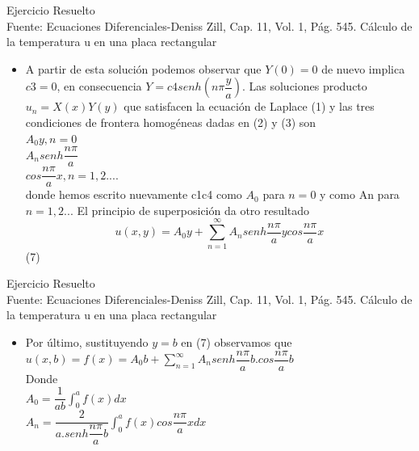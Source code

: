 \documentclass[10pt,a4paper]{beamer}
\begin{document}
\begin{frame}{Ejercicio Resuelto\\
}{Fuente: Ecuaciones Diferenciales-Deniss Zill, Cap. 11, Vol. 1, Pág. 545.
Cálculo de la temperatura u en una placa rectangular}


  \begin{itemize}
  \item
   A partir de esta solución podemos observar que $Y(0)=0$ de nuevo implica $c3=0$, en
consecuencia $Y=c4senh(n\pi\dfrac{y}{a})$.
Las soluciones producto $u_{n}=X(x)Y(y)$ que satisfacen la ecuación de Laplace (1) y las
tres condiciones de frontera homogéneas dadas en (2) y (3) son\\
$A_{0}y, n=0$\\
$A_{n}senh\dfrac{n\pi}{a}$\\
$cos\dfrac{n\pi}{a}x, n=1,2....$\\
donde hemos escrito nuevamente c1c4 como $A_{0}$ para $n=0$ y como An para $n=1,2...$
El principio de superposición da otro resultado\\
$$u(x,y)=A_{0}y+\sum^{\infty}_{n=1}A_{n}senh\dfrac{n\pi}{a}ycos\dfrac{n\pi}{a}x$$ (7)\\


    
  \end{itemize}
\end{frame}

\begin{frame}{Ejercicio Resuelto\\
}{Fuente: Ecuaciones Diferenciales-Deniss Zill, Cap. 11, Vol. 1, Pág. 545.
Cálculo de la temperatura u en una placa rectangular}


  \begin{itemize}
  \item
   Por último, sustituyendo $y=b$ en (7) observamos que
$u(x,b)=f(x)=A_{0}b+\sum^{\infty}_{n=1}A_{n}senh\dfrac{n\pi}{a}b.cos\dfrac{n\pi}{a}b$\\
Donde\\
$A_{0}=\dfrac{1}{ab}\int_{0}^{a}f(x)dx$\\
$A_{n}=\dfrac{2}{a.senh\dfrac{n\pi}{a}b}\int^{a}_{0}f(x)cos\dfrac{n\pi}{a}xdx$

    
  \end{itemize}
\end{frame}
\end{document}
